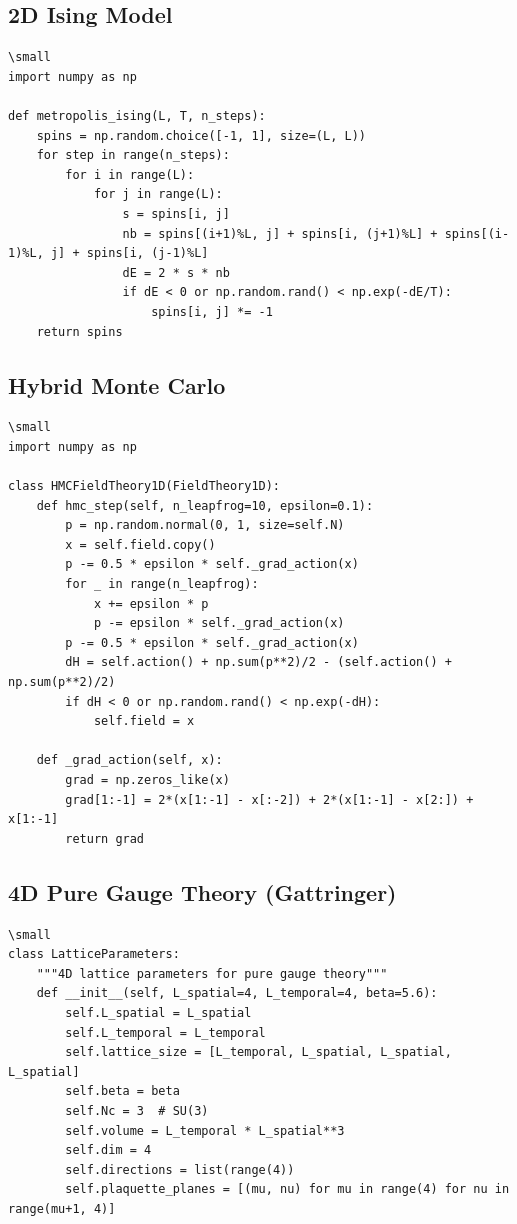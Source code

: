 \documentclass[12pt]{article}
\begin{document}
\subsection{2D Ising Model}
\begin{verbatim}
\small
import numpy as np

def metropolis_ising(L, T, n_steps):
    spins = np.random.choice([-1, 1], size=(L, L))
    for step in range(n_steps):
        for i in range(L):
            for j in range(L):
                s = spins[i, j]
                nb = spins[(i+1)%L, j] + spins[i, (j+1)%L] + spins[(i-1)%L, j] + spins[i, (j-1)%L]
                dE = 2 * s * nb
                if dE < 0 or np.random.rand() < np.exp(-dE/T):
                    spins[i, j] *= -1
    return spins
\end{verbatim}

\subsection{Hybrid Monte Carlo}
\begin{verbatim}
\small
import numpy as np

class HMCFieldTheory1D(FieldTheory1D):
    def hmc_step(self, n_leapfrog=10, epsilon=0.1):
        p = np.random.normal(0, 1, size=self.N)
        x = self.field.copy()
        p -= 0.5 * epsilon * self._grad_action(x)
        for _ in range(n_leapfrog):
            x += epsilon * p
            p -= epsilon * self._grad_action(x)
        p -= 0.5 * epsilon * self._grad_action(x)
        dH = self.action() + np.sum(p**2)/2 - (self.action() + np.sum(p**2)/2)
        if dH < 0 or np.random.rand() < np.exp(-dH):
            self.field = x

    def _grad_action(self, x):
        grad = np.zeros_like(x)
        grad[1:-1] = 2*(x[1:-1] - x[:-2]) + 2*(x[1:-1] - x[2:]) + x[1:-1]
        return grad
\end{verbatim}

\subsection{4D Pure Gauge Theory (Gattringer)}
\begin{verbatim}
\small
class LatticeParameters:
    """4D lattice parameters for pure gauge theory"""
    def __init__(self, L_spatial=4, L_temporal=4, beta=5.6):
        self.L_spatial = L_spatial
        self.L_temporal = L_temporal
        self.lattice_size = [L_temporal, L_spatial, L_spatial, L_spatial]
        self.beta = beta
        self.Nc = 3  # SU(3)
        self.volume = L_temporal * L_spatial**3
        self.dim = 4
        self.directions = list(range(4))
        self.plaquette_planes = [(mu, nu) for mu in range(4) for nu in range(mu+1, 4)]
\end{verbatim}
\end{document}
